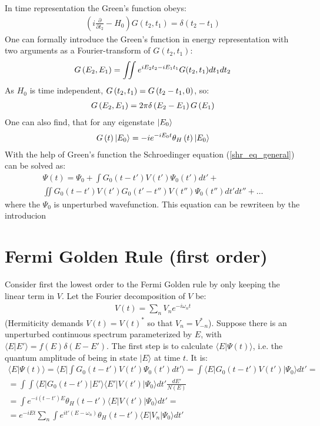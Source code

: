In time representation the Green's function obeys:
\begin{gather}
	\left(i\frac{\partial}{\partial t_{2}}-H_{0}\right)G(t_{2},t_{1})=\delta(t_{2}-t_{1})
\end{gather}
One can formally introduce the Green's function in energy representation with two arguments as a Fourier-transform of $ G(t_{2},t_{1}) $:
\begin{gather}
	G\left(E_2,E_1\right)
	=
	\iint
	e^{iE_2t_2-iE_1t_1}
	G(t_{2},t_{1})
	dt_1
	dt_2
\end{gather}
As $ H_0 $ is time independent, $ G\left(t_2,t_1\right)=G\left(t_2-t_1,0\right) $, so:
\begin{gather}
	G\left(E_2,E_1\right)=2\pi \delta\left(E_2-E_1\right) G\left(E_1\right)
\end{gather}
One can also find, that for any eigenstate $ \ket{E_0} $
\begin{gather}
	G\left(t\right)\ket{E_0}
	=
	-ie^{-iE_0t}\theta_H\left(t\right)\ket{E_0}
\end{gather}
With the help of Green's function the Schroedinger equation (\ref{shr_eq_general}) can be solved as:
\begin{multline}
\label{general_expression_for the_wavefunction}
\Psi(t)=\Psi_{0}+\int G_{0}(t-t')V(t')\Psi_{0}(t')dt'+
\\
\iint G_{0}(t-t')V(t')G_{0}(t'-t'')V(t'')\Psi_{0}(t'')dt'dt''+\dots
\end{multline}
where the $ \Psi_0 $ is unperturbed wavefunction. This equation can be rewriteen  by the introducion 
\section{Fermi Golden Rule (first order)}

Consider first the lowest order to the Fermi Golden rule by only keeping the linear term in $ V $. Let the Fourier decomposition of $ V $ be:
\begin{gather}
\label{fourier_pertrubation}
	V(t)=\sum_n V_{n}e^{-i\omega_{n}t}
\end{gather}
(Hermiticity demands $ V(t)=V(t)^{*} $ so that $ V_{n}=V_{-n}^{*} $). Suppose there is an unperturbed continuous spectrum parameterized by $ E $, with $ \langle E|E'\rangle=f(E)\delta(E-E') $. The first step is to calculate $ \langle E|\Psi(t)\rangle $, i.e. the quantum amplitude of being in state $ |E\rangle $ at time $ t $. It is:
\begin{multline}
	\langle E|\Psi(t)\rangle=\langle E|\int G_{0}(t-t')V(t')\Psi_{0}(t')dt'\rangle=\int\langle E|G_{0}(t-t')V(t')|\Psi_{0}\rangle dt'=\\=\int\int\langle E|G_{0}(t-t')|E'\rangle\langle E'|V(t')|\Psi_{0}\rangle dt'\frac{dE'}{N(E)}
	\\=\int e^{-i(t-t')E}\theta_{H}(t-t')\langle E|V(t')|\Psi_{0}\rangle dt'=\\=e^{-iEt}\sum_{n}\int e^{it'(E-\omega_{n})}\theta_{H}(t-t')\langle E|V_{n}|\Psi_{0}\rangle dt'
\end{multline}

